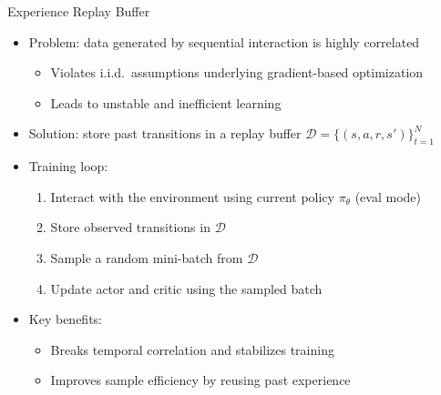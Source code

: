 \documentclass[aspectratio=169]{beamer}
\newcommand{\1}{\mathbf{1}}
\begin{document}
\begin{frame}{Experience Replay Buffer}
  \begin{itemize}
      \item Problem: data generated by sequential interaction is highly correlated
      \begin{itemize}
          \item Violates i.i.d.\ assumptions underlying gradient-based optimization
          \item Leads to unstable and inefficient learning
      \end{itemize}
      \item Solution: store past transitions in a replay buffer $\mathcal{D} = \{(s, a, r, s')\}_{t=1}^{N}$
      \item Training loop:
      \begin{enumerate}
          \item Interact with the environment using current policy $\pi_\theta$ (eval mode)
          \item Store observed transitions in $\mathcal{D}$
          \item Sample a random mini-batch from $\mathcal{D}$
          \item Update actor and critic using the sampled batch
      \end{enumerate}
      \item Key benefits:
      \begin{itemize}
          \item Breaks temporal correlation and stabilizes training
          \item Improves sample efficiency by reusing past experience
      \end{itemize}
  \end{itemize}
  \end{frame}
\end{document}
